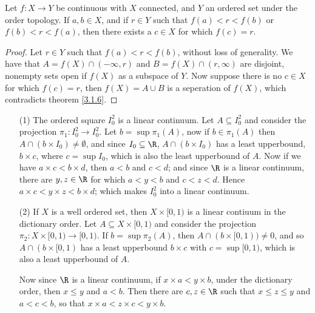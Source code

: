 \begin{theorem}\label{3.2.2}
    Let $f:X \rightarrow Y$ be continuous with  $X$ connected, and  $Y$ an ordered set under the
    order topology. If  $a,b \in X$, and if  $r \in Y$ such that  $f(a)<r<f(b)$ or $f(b)<r<f(a)$,
    then there exists a $c \in X$ for which  $f(c)=r$.
\end{theorem}
\begin{proof}
    Let $r \in Y$ such that  $f(a)<r<f(b)$, without loss of generality. We have that $A=f(X) \cap
    (-\infty, r)$ and $B=f(X) \cap (r ,\infty)$ are disjoint, nonempty sets open if $f(X)$ as a
    subspace of $Y$. Now suppose there is no  $c \in X$ for which  $f(c)=r$, then $f(X)=A \cup B$ is
    a seperation of $f(X)$, which contradicts theorem \ref{3.1.6}.
\end{proof}

\begin{example}
    \begin{enumerate}
        \item[(1)] The ordered square $I_0^2$ is a linear continuum. Let $A \subseteq I_0^2$ and consider
            the projection $\pi_1:I_0^2 \rightarrow I_0^2$. Let $b=\sup{\pi_1(A)}$, now if $b \in
            \pi_1(A)$ then $A \cap (b \times I_0) \neq \emptyset$, and since $I_0 \subseteq \R$, $A
            \cap (b \times I_0)$ has a least upperbound, $b \times c$, where  $c=\sup{I_0}$, which
            is also the least upperbound of $A$. Now if we have $a \times c < b \times d$, then
            $a<b$ and  $c<d$; and since  $\R$ is a linear continuum, there are $y,z \in \R$ for
            which  $a<y<b$ and  $c<z<d$. Hence  $a \times c < y \times z < b \times d$; which makes
            $ I_0^2$ into a linear continuum.

        \item[(2)] If $X$ is a well ordered set, then  $X \times [0,1)$ is a linear contiuum in the
            dictionary order. Let $A \subseteq X \times [0,1)$ and consider the projection $\pi_2:X
            \times [0,1) \rightarrow [0,1)$. If $b=\sup{\pi_2(A)}$, then $A \cap (b \times [0,1)) \neq
            0$, and so $A \cap (b \times [0,1)$ has a least upperbound $b \times c$ with
            $c=\sup{[0,1)}$, which is also a least upperbound of $A$.

            Now since $\R$ is a linear continuum, if $x \times a < y \times b$, under the dictionary
            order, then  $x \leq y$ and  $a<b$. Then there are  $c,z \in \R$ such that  $x \leq z
            \leq y$ and  $a<c<b$, so that $x \times a < z \times c < y \times b$.
    \end{enumerate}
\end{example}

